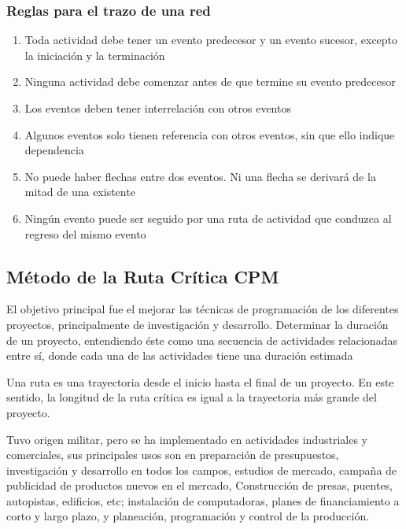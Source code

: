 \subsubsection{Reglas para el trazo de una red}
\begin{enumerate}
    \item Toda actividad debe tener un evento predecesor y un evento sucesor, excepto la iniciación y la terminación
    \item Ninguna actividad debe comenzar antes de que termine su evento predecesor
    \item Los eventos deben tener interrelación con otros eventos
    \item Algunos eventos solo tienen referencia con otros eventos, sin que ello indique dependencia
    \item No puede haber flechas entre dos eventos. Ni una flecha se derivará de la mitad de una existente
    \item Ningún evento puede ser seguido por una ruta de actividad que conduzca al regreso del mismo evento
\end{enumerate}
\subsection{Método de la Ruta Crítica CPM}
El objetivo principal fue el mejorar las técnicas de programación de los diferentes proyectos, principalmente de investigación y desarrollo. Determinar la duración de un proyecto, entendiendo éste como una secuencia de actividades relacionadas entre sí, donde cada una de las actividades tiene una duración estimada

Una ruta es una trayectoria desde el inicio hasta el final de un proyecto. En este sentido, la longitud de la ruta crítica es igual a la trayectoria más grande del proyecto.

Tuvo origen militar, pero se ha implementado en actividades industriales y comerciales, sus principales usos son en preparación de presupuestos, investigación y desarrollo en todos los campos, estudios de mercado, campaña de publicidad de productos nuevos en el mercado, Construcción de presas, puentes, autopistas, edificios, etc; instalación de computadoras, planes de financiamiento a corto y largo plazo, y planeación, programación y control de la producción.

